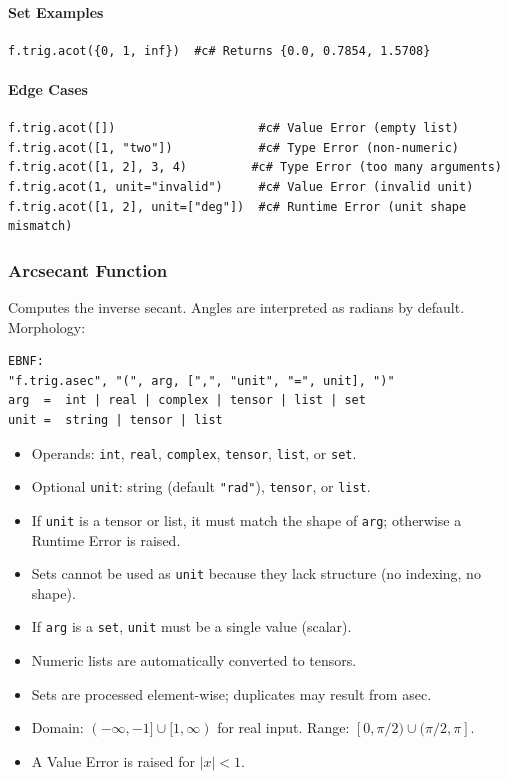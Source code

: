 \paragraph{Set Examples}
\begin{verbatim}
f.trig.acot({0, 1, inf})  #c# Returns {0.0, 0.7854, 1.5708}
\end{verbatim}

\paragraph{Edge Cases}
\begin{verbatim}
f.trig.acot([])                    #c# Value Error (empty list)
f.trig.acot([1, "two"])            #c# Type Error (non-numeric)
f.trig.acot([1, 2], 3, 4)         #c# Type Error (too many arguments)
f.trig.acot(1, unit="invalid")     #c# Value Error (invalid unit)
f.trig.acot([1, 2], unit=["deg"])  #c# Runtime Error (unit shape mismatch)
\end{verbatim}

\subsubsection{Arcsecant Function}
Computes the inverse secant. Angles are interpreted as radians by default.\\
Morphology:
\begin{verbatim}
EBNF:
"f.trig.asec", "(", arg, [",", "unit", "=", unit], ")"
arg  =  int | real | complex | tensor | list | set
unit =  string | tensor | list
\end{verbatim}
\begin{itemize}
\item Operands: \texttt{int}, \texttt{real}, \texttt{complex}, \texttt{tensor}, \texttt{list}, or \texttt{set}.
\item Optional \texttt{unit}: string (default \texttt{"rad"}), \texttt{tensor}, or \texttt{list}.
\item If \texttt{unit} is a tensor or list, it must match the shape of \texttt{arg}; otherwise a Runtime Error is raised.
\item Sets cannot be used as \texttt{unit} because they lack structure (no indexing, no shape).
\item If \texttt{arg} is a \texttt{set}, \texttt{unit} must be a single value (scalar).
\item Numeric lists are automatically converted to tensors.
\item Sets are processed element-wise; duplicates may result from asec.
\item Domain: $(-\infty, -1] \cup [1, \infty)$ for real input. Range: $[0, \pi/2) \cup (\pi/2, \pi]$.
\item A Value Error is raised for $|x| < 1$.
\end{itemize}

